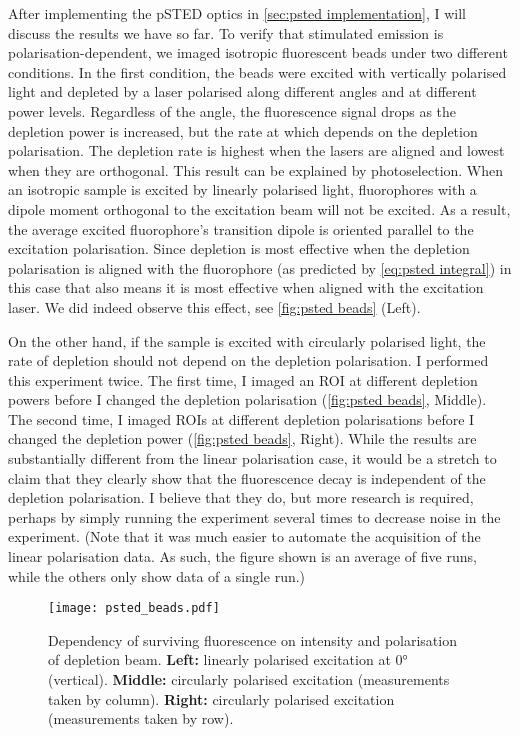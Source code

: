 After implementing the pSTED optics in \autoref{sec:psted implementation}, I will discuss the results we have so far. To verify that stimulated emission is polarisation-dependent, we imaged isotropic fluorescent beads under two different conditions. In the first condition, the beads were excited with vertically polarised light and depleted by a laser polarised along different angles and at different power levels. Regardless of the angle, the fluorescence signal drops as the depletion power is increased, but the rate at which depends on the depletion polarisation. The depletion rate is highest when the lasers are aligned and lowest when they are orthogonal. This result can be explained by photoselection. When an isotropic sample is excited by linearly polarised light, fluorophores with a dipole moment orthogonal to the excitation beam will not be excited. As a result, the average excited fluorophore's transition dipole is oriented parallel to the excitation polarisation. Since depletion is most effective when the depletion polarisation is aligned with the fluorophore (as predicted by \autoref{eq:psted integral}) in this case that also means it is most effective when aligned with the excitation laser. We did indeed observe this effect, see \autoref{fig:psted beads} (Left). 

On the other hand, if the sample is excited with circularly polarised light, the rate of depletion should not depend on the depletion polarisation. I performed this experiment twice. The first time, I imaged an ROI at different depletion powers before I changed the depletion polarisation (\autoref{fig:psted beads}, Middle). The second time, I imaged ROIs at different depletion polarisations before I changed the depletion power (\autoref{fig:psted beads}, Right). While the results are substantially different from the linear polarisation case, it would be a stretch to claim that they clearly show that the fluorescence decay is independent of the depletion polarisation. I believe that they do, but more research is required, perhaps by simply running the experiment several times to decrease noise in the experiment. (Note that it was much easier to automate the acquisition of the linear polarisation data. As such, the figure shown is an average of five runs, while the others only show data of a single run.)

\begin{figure}
	\centering
	\texttt{[image: psted\_beads.pdf]}
	\caption{
		Dependency of surviving fluorescence on intensity and polarisation of depletion beam. \textbf{Left:} linearly polarised excitation at 0° (vertical). \textbf{Middle:} circularly polarised excitation (measurements taken by column). \textbf{Right:} circularly polarised excitation (measurements taken by row).
	}
	\label{fig:psted beads}
\end{figure}

